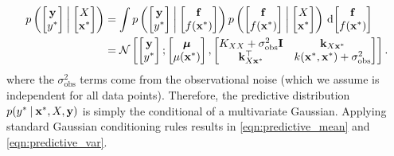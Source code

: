 \begin{align*}
  p \left(
    \begin{bmatrix} \by \\ \ytest \end{bmatrix} \: \middle| \:
    \begin{bmatrix} \bX \\ \bxtest \end{bmatrix}
  \right)
  &= \int
    p \left(
      \begin{bmatrix} \by \\ \ytest \end{bmatrix} \: \middle| \:
      \begin{bmatrix} \bfn \\ f(\bxtest) \end{bmatrix}
    \right)
    p \left(
      \begin{bmatrix} \bfn \\ f(\bxtest) \end{bmatrix} \: \middle| \:
      \begin{bmatrix} \bX \\ \bxtest \end{bmatrix}
    \right)
    \intd { \begin{bmatrix} \bfn \\ f(\bxtest) \end{bmatrix} }
  \\
  \vspace{0.5em}
  &= \normaldist{
    \begin{bmatrix} \by \\ \ytest \end{bmatrix} ;
    \begin{bmatrix} \bmu \\ \mu(\bxtest) \end{bmatrix}
  }{
    \begin{bmatrix}
      \bK_{\bX \bX} + \sigma_\text{obs}^2 \mathbf I   & \bk_{\bX \bxtest} \\
      \bk_{\bX \bxtest}^\top         & k(\bxtest, \bxtest) + \sigma_\text{obs}^2
    \end{bmatrix}
  }.
\end{align*}
where the $\sigma_\text{obs}^2$ terms come from the observational noise (which we assume is independent for all data points).
%
Therefore, the predictive distribution $p(y^* \: \vert \: \mathbf{x}^*, X, \mathbf{y})$ is simply the conditional of a multivariate Gaussian.
Applying standard Gaussian conditioning rules \citep[see e.g.][]{bishop2006pattern,rasmussen2006gaussian} results in \cref{eqn:predictive_mean} and \cref{eqn:predictive_var}.

